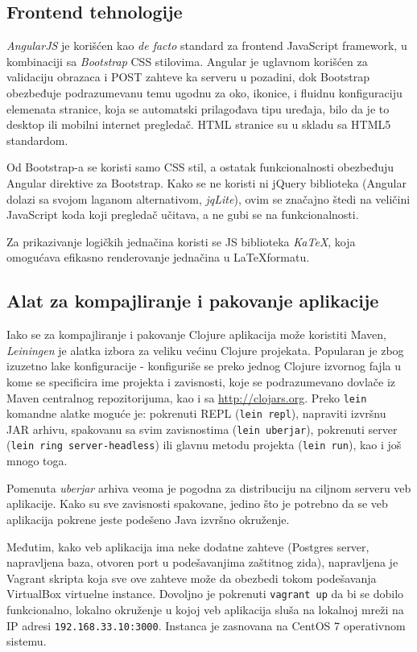 \subsection{Frontend tehnologije}

\emph{AngularJS}\cite{angularjs} je korišćen kao \textit{de facto} standard za frontend JavaScript framework, u kombinaciji sa \emph{Bootstrap}\cite{bootstrap} CSS stilovima. Angular je uglavnom korišćen za validaciju obrazaca i POST zahteve ka serveru u pozadini, dok Bootstrap obezbeđuje podrazumevanu temu ugodnu za oko, ikonice, i fluidnu konfiguraciju elemenata stranice, koja se automatski prilagođava tipu uređaja, bilo da je to desktop ili mobilni internet pregledač. HTML stranice su u skladu sa HTML5 standardom.

Od Bootstrap-a se koristi samo CSS stil, a ostatak funkcionalnosti obezbeđuju Angular direktive za Bootstrap\cite{ui-bootstrap}. Kako se ne koristi ni jQuery biblioteka (Angular dolazi sa svojom laganom alternativom, \textit{jqLite}), ovim se značajno štedi na veličini JavaScript koda koji pregledač učitava, a ne gubi se na funkcionalnosti.

Za prikazivanje logičkih jednačina koristi se JS biblioteka \emph{KaTeX}\cite{katex}, koja omogućava efikasno renderovanje jednačina u \LaTeX \space formatu.

\subsection{Alat za kompajliranje i pakovanje aplikacije}

Iako se za kompajliranje i pakovanje Clojure aplikacija može koristiti Maven, \emph{Leiningen}\cite{leiningen} je alatka izbora za veliku većinu Clojure projekata. Popularan je zbog izuzetno lake konfiguracije - konfiguriše se preko jednog Clojure izvornog fajla u kome se specificira ime projekta i zavisnosti, koje se podrazumevano dovlače iz Maven centralnog repozitorijuma, kao i sa \url{http://clojars.org}. Preko \texttt{lein} komandne alatke moguće je: pokrenuti REPL (\texttt{lein repl}), napraviti izvršnu JAR arhivu, spakovanu sa svim zavisnostima (\texttt{lein uberjar}), pokrenuti server (\texttt{lein ring server-headless}) ili glavnu metodu projekta (\texttt{lein run}), kao i još mnogo toga.

Pomenuta \emph{uberjar} arhiva veoma je pogodna za distribuciju na ciljnom serveru veb aplikacije. Kako su sve zavisnosti spakovane, jedino što je potrebno da se veb aplikacija pokrene jeste podešeno Java izvršno okruženje.

Međutim, kako veb aplikacija ima neke dodatne zahteve (Postgres server, napravljena baza, otvoren port u podešavanjima zaštitnog zida), napravljena je Vagrant skripta koja sve ove zahteve može da obezbedi tokom podešavanja VirtualBox virtuelne instance. Dovoljno je pokrenuti \texttt{vagrant up} da bi se dobilo funkcionalno, lokalno okruženje u kojoj veb aplikacija sluša na lokalnoj mreži na IP adresi \texttt{192.168.33.10:3000}. Instanca je zasnovana na CentOS 7 operativnom sistemu.